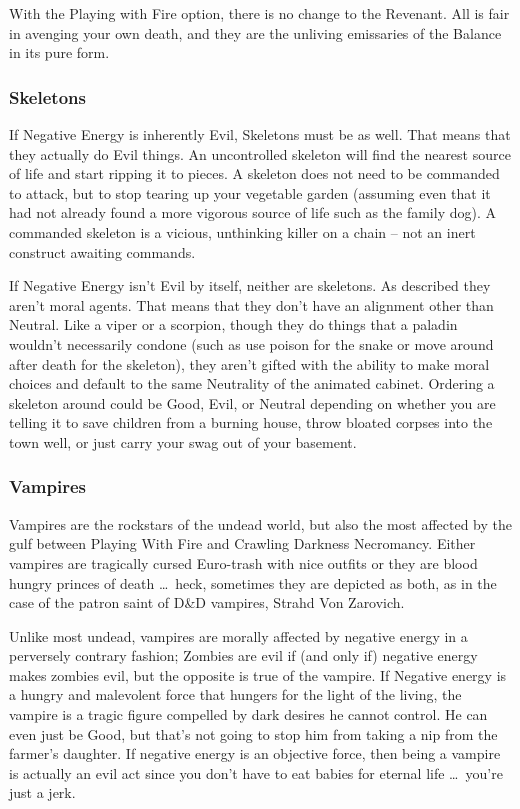With the Playing with Fire option, there is no change to the Revenant. All is fair in avenging your own death, and they are the unliving emissaries of the Balance in its pure form.

\subsubsection{Skeletons} If Negative Energy is inherently Evil, Skeletons must be as well. That means that they actually do Evil things. An uncontrolled skeleton will find the nearest source of life and start ripping it to pieces. A skeleton does not need to be commanded to attack, but to stop tearing up your vegetable garden (assuming even that it had not already found a more vigorous source of life such as the family dog). A commanded skeleton is a vicious, unthinking killer on a chain -- not an inert construct awaiting commands.

If Negative Energy isn't Evil by itself, neither are skeletons. As described they aren't moral agents. That means that they don't have an alignment other than Neutral. Like a viper or a scorpion, though they do things that a paladin wouldn't necessarily condone (such as use poison for the snake or move around after death for the skeleton), they aren't gifted with the ability to make moral choices and default to the same Neutrality of the animated cabinet. Ordering a skeleton around could be Good, Evil, or Neutral depending on whether you are telling it to save children from a burning house, throw bloated corpses into the town well, or just carry your swag out of your basement.

\subsubsection{Vampires} Vampires are the rockstars of the undead world, but also the most affected by the gulf between Playing With Fire and Crawling Darkness Necromancy. Either vampires are tragically cursed Euro-trash with nice outfits or they are blood hungry princes of death \ldots\ heck, sometimes they are depicted as both, as in the case of the patron saint of D\&D vampires, Strahd Von Zarovich.

Unlike most undead, vampires are morally affected by negative energy in a perversely contrary fashion; Zombies are evil if (and only if) negative energy makes zombies evil, but the opposite is true of the vampire. If Negative energy is a hungry and malevolent force that hungers for the light of the living, the vampire is a tragic figure compelled by dark desires he cannot control. He can even just be Good, but that's not going to stop him from taking a nip from the farmer's daughter. If negative energy is an objective force, then being a vampire is actually an evil act since you don't have to eat babies for eternal life \ldots\  you're just a jerk.

